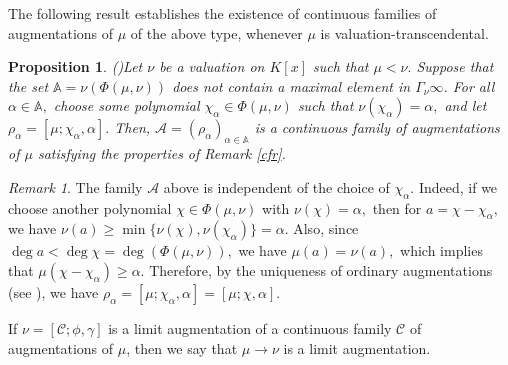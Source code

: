 \documentclass[11pt]{amsart}
\newtheorem{proposition}[theorem]{Proposition}
\theoremstyle{definition}
\theoremstyle{remark}
\newtheorem{remark}[theorem]{Remark}
\numberwithin{equation}{section}
\begin{document}
The following result establishes the existence of continuous families of augmentations of $\mu$ of the above type, whenever $\mu$ is valuation-transcendental.
\begin{proposition}(\cite[Proposition 3.3]{EN1})\label{cf1}
	Let $\nu$ be a valuation on $K[x]$ such that $\mu<\nu.$ Suppose that the set $\mathbb{A}=\nu(\Phi(\mu,\nu))$ does not contain a maximal element in $\Gamma_{\nu}\infty$. For all $\alpha\in\mathbb{A},$ choose some polynomial $\chi_{\alpha}\in\Phi(\mu,\nu)$ such that $\nu(\chi_{\alpha})=\alpha,$ and let $\rho_\alpha=[\mu;\chi_\alpha,\alpha].$ Then, $\mathcal{A}=(\rho_{\alpha})_{\alpha\in\mathbb{A}}$ is a continuous family of augmentations of $\mu$ satisfying the properties of Remark \ref{cfr}. 
\end{proposition}

\begin{remark}\label{r1}
The family $\mathcal{A}$ above is independent of the choice of $\chi_\alpha$. Indeed, if we choose another polynomial $\chi\in \Phi(\mu,\nu)$ with $\nu(\chi)=\alpha,$ then for $a=\chi-\chi_\alpha,$ we have $\nu(a)\geq \min\{\nu(\chi),\nu(\chi_\alpha)\}=\alpha.$ Also, since $\deg a<\deg\chi=\deg(\Phi(\mu,\nu)),$ we have $\mu(a)=\nu(a),$ which implies that $\mu(\chi-\chi_\alpha)\geq \alpha.$ Therefore, by the uniqueness of ordinary augmentations (see \cite[Lemma 2.8]{EN1}), we have $\rho_\alpha=[\mu;\chi_\alpha,\alpha]=[\mu;\chi,\alpha].$	
\end{remark}

	If $\nu=[\mathcal{C};\phi,\gamma]$ is a limit augmentation of a continuous family $\mathcal{C}$ of augmentations of $\mu$, then we say that $\mu\longrightarrow \nu$ is a limit augmentation.
\end{document}
